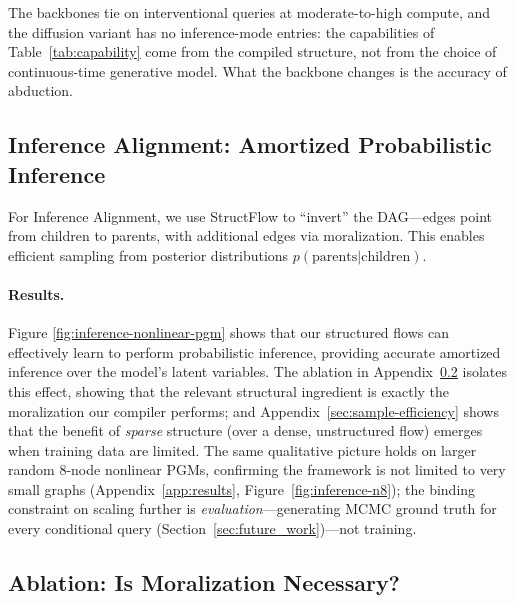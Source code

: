The backbones tie on interventional queries at moderate-to-high compute, and the diffusion variant has no inference-mode entries: the capabilities of Table~\ref{tab:capability} come from the compiled structure, not from the choice of continuous-time generative model. What the backbone changes is the accuracy of abduction.

\subsection{Inference Alignment: Amortized Probabilistic Inference}

For Inference Alignment, we use StructFlow to ``invert'' the DAG---edges point from children to parents, with additional edges via moralization. This enables efficient sampling from posterior distributions $p(\text{parents} | \text{children})$.

\paragraph{Results.} Figure \ref{fig:inference-nonlinear-pgm} shows that our structured flows can effectively learn to perform probabilistic inference, providing accurate amortized inference over the model's latent variables.  The ablation in Appendix~\ref{sec:moralization-ablation} isolates this effect, showing that the relevant structural ingredient is exactly the moralization our compiler performs; and Appendix~\ref{sec:sample-efficiency} shows that the benefit of \emph{sparse} structure (over a dense, unstructured flow) emerges when training data are limited. The same qualitative picture holds on larger random $8$-node nonlinear PGMs, confirming the framework is not limited to very small graphs (Appendix~\ref{app:results}, Figure~\ref{fig:inference-n8}); the binding constraint on scaling further is \emph{evaluation}---generating MCMC ground truth for every conditional query (Section~\ref{sec:future_work})---not training.

\subsection{Ablation: Is Moralization Necessary?}
\label{sec:moralization-ablation}

